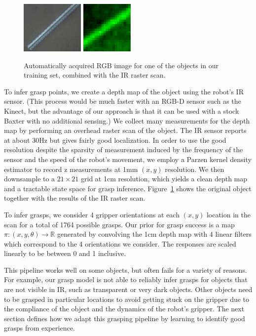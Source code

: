 \documentclass{article}
\begin{document}
\begin{figure}
  \centering
\includegraphics[height=1in]{figures/ruler_rgb.png}
\includegraphics[height=1in]{figures/ruler_ir.png}
\caption{Automatically acquired RGB image for one of the objects in our
  training set, combined with the IR raster scan.\label{fig:ir}}
\end{figure}

To infer grasp points, we create a depth map of the object using the
robot's IR sensor.  (This process would be much faster with an RGB-D
sensor such as the Kinect, but the advantage of our approach is that
it can be used with a stock Baxter with no additional sensing.)  We
collect many measurements for the depth map by performing an overhead
raster scan of the object. The IR sensor reports at about 30Hz but
gives fairly good localization.  In order to use the good resolution
despite the sparsity of measurement induced by the frequency of the
sensor and the speed of the robot's movement, we employ a Parzen
kernel density estimator to record z measurements at 1mm $(x,y)$
resolution. We then downsample to a $21 \times 21$ grid at 1cm
resolution, which yields a clean depth map and a tractable state space
for grasp inference.  Figure~\ref{fig:ir} shows the original object
together with the results of the IR raster scan.

To infer grasps, we consider 4 gripper orientations at each $(x,y)$
location in the scan for a total of 1764 possible grasps. Our prior
for grasp success is a map $\pi:(x,y,\theta) \rightarrow \mathbb{R}$
generated by convolving the 1cm depth map with 4 linear filters which
correspond to the 4 orientations we consider. The responses are scaled
linearly to be between 0 and 1 inclusive.

This pipeline works well on some objects, but often fails for a
variety of reasons.  For example, our grasp model is not able to 
reliably infer grasps for objects that are not visible in IR, such as
transparent or very dark objects.  Other objects need to be
grasped in particular locations to avoid getting stuck on the gripper
due to the compliance of the object and the dynamics of the robot's
gripper.  The next section defines how we adapt this grasping pipeline
by learning to identify good grasps from experience.
\end{document}
